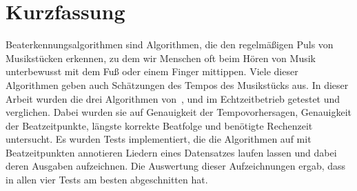 \chapter*{Kurzfassung}

Beaterkennungsalgorithmen sind Algorithmen,
	die den regelmä{\ss}igen Puls von Musikstücken erkennen,
	zu dem wir Menschen oft beim Hören von Musik unterbewusst mit dem Fu{\ss} oder einem Finger mittippen.
Viele dieser Algorithmen geben auch Schätzungen des Tempos des Musikstücks aus.
In dieser Arbeit wurden die drei Algorithmen
	von~\cite{2001_BeatThis}, \cite{2009_DaPlSt} und \cite{2011_PlRoSt}
	im Echtzeitbetrieb getestet und verglichen.
Dabei wurden sie auf
	Genauigkeit der Tempovorhersagen, Genauigkeit der Beatzeitpunkte, längste korrekte Beatfolge und benötigte Rechenzeit
	untersucht.
Es wurden Tests implementiert,
	die die Algorithmen auf mit Beatzeitpunkten annotieren Liedern eines Datensatzes laufen lassen
	und dabei deren Ausgaben aufzeichnen.
Die Auswertung dieser Aufzeichnungen ergab,
	dass \cite{2009_DaPlSt} in allen vier Tests am besten abgeschnitten hat.
